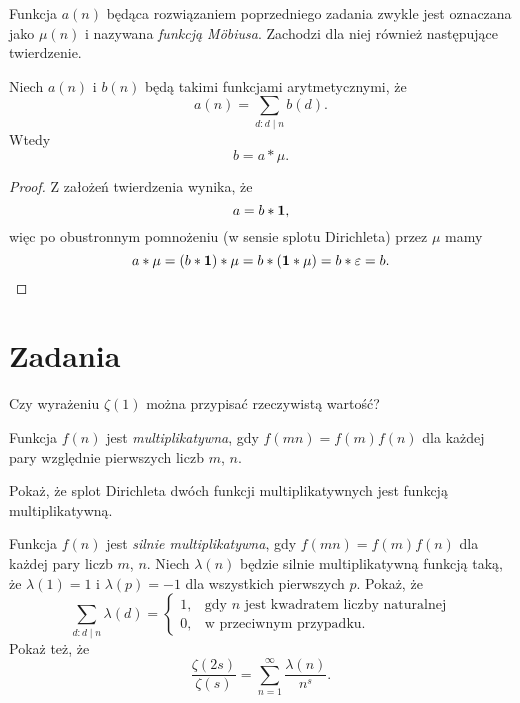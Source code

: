 \documentclass[shortabstract]{imthesis}
\begin{document}
Funkcja $a(n)$ będąca rozwiązaniem poprzedniego zadania zwykle jest oznaczana jako $\mu(n)$ i nazywana \emph{funkcją M\"obiusa}. Zachodzi dla niej również następujące twierdzenie.

\begin{theorem}
    Niech $a(n)$ i $b(n)$ będą takimi funkcjami arytmetycznymi, że
    $$
    a(n) = \sum_{d : d \mid n} b(d).
    $$
    Wtedy
    $$
    b = a * \mu.
    $$
\end{theorem}
\begin{proof}
    Z założeń twierdzenia wynika, że
    $$
    a = b * \mathbf{1},
    $$
    więc po obustronnym pomnożeniu (w sensie splotu Dirichleta) przez $\mu$ mamy
    $$
    a * \mu = (b * \mathbf{1}) * \mu = b * (\mathbf{1} * \mu) = b * \varepsilon = b. 
    $$
\end{proof}

\newpage
\section{Zadania}

\begin{problem} \label{problem:zeta1}
    Czy wyrażeniu $\zeta(1)$ można przypisać rzeczywistą wartość? 
\end{problem}

\begin{problem} \label{problem:multdirichlet}
    Funkcja $f(n)$ jest \emph{multiplikatywna}, gdy $f(mn) = f(m)f(n)$ dla każdej pary względnie pierwszych liczb $m$, $n$.
    
    Pokaż, że splot Dirichleta dwóch funkcji multiplikatywnych jest funkcją multiplikatywną.
\end{problem}

\begin{problem} \label{problem:stronglymultdirichlet}
    Funkcja $f(n)$ jest \emph{silnie multiplikatywna}, gdy $f (mn) = f (m)f (n)$ dla każdej pary liczb $m$, $n$. Niech $\lambda(n)$ będzie silnie multiplikatywną funkcją taką, że $\lambda(1) = 1$ i $\lambda(p) = -1$ dla wszystkich pierwszych $p$. Pokaż, że
    $$
    \sum_{d : d\mid n} \lambda(d) = \begin{cases} 1, &\text{gdy $n$ jest kwadratem liczby naturalnej} \\ 0, &\text{w przeciwnym przypadku.} \end{cases}
    $$
    Pokaż też, że
    $$
    \frac{\zeta(2s)}{\zeta(s)} = \sum_{n=1}^\infty \frac{\lambda(n)}{n^s}.
    $$
\end{problem}
\end{document}
